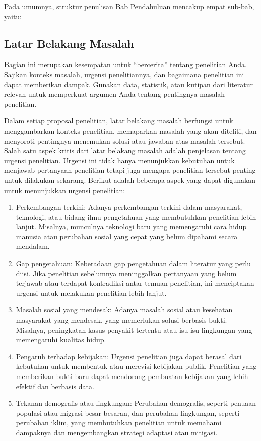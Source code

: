 \documentclass[
  indonesian,
  letterpaper,
]{scrbook}
\providecommand{\tightlist}{%
  \setlength{\itemsep}{0pt}\setlength{\parskip}{0pt}}
\begin{document}
Pada umumnya, struktur penulisan Bab Pendahuluan mencakup empat sub-bab,
yaitu:

\subsection*{Latar Belakang Masalah}\label{latar-belakang-masalah}

Bagian ini merupakan kesempatan untuk ``bercerita'' tentang penelitian
Anda. Sajikan konteks masalah, urgensi penelitiannya, dan bagaimana
penelitian ini dapat memberikan dampak. Gunakan data, statistik, atau
kutipan dari literatur relevan untuk memperkuat argumen Anda tentang
pentingnya masalah penelitian.

Dalam setiap proposal penelitian, latar belakang masalah berfungsi untuk
menggambarkan konteks penelitian, memaparkan masalah yang akan diteliti,
dan menyoroti pentingnya menemukan solusi atau jawaban atas masalah
tersebut. Salah satu aspek kritis dari latar belakang masalah adalah
penjelasan tentang urgensi penelitian. Urgensi ini tidak hanya
menunjukkan kebutuhan untuk menjawab pertanyaan penelitian tetapi juga
mengapa penelitian tersebut penting untuk dilakukan sekarang. Berikut
adalah beberapa aspek yang dapat digunakan untuk menunjukkan urgensi
penelitian:

\begin{enumerate}
\def\labelenumi{\arabic{enumi}.}
\tightlist
\item
  Perkembangan terkini: Adanya perkembangan terkini dalam masyarakat,
  teknologi, atau bidang ilmu pengetahuan yang membutuhkan penelitian
  lebih lanjut. Misalnya, munculnya teknologi baru yang memengaruhi cara
  hidup manusia atau perubahan sosial yang cepat yang belum dipahami
  secara mendalam.
\item
  Gap pengetahuan: Keberadaan gap pengetahuan dalam literatur yang perlu
  diisi. Jika penelitian sebelumnya meninggalkan pertanyaan yang belum
  terjawab atau terdapat kontradiksi antar temuan penelitian, ini
  menciptakan urgensi untuk melakukan penelitian lebih lanjut.
\item
  Masalah sosial yang mendesak: Adanya masalah sosial atau kesehatan
  masyarakat yang mendesak, yang memerlukan solusi berbasis bukti.
  Misalnya, peningkatan kasus penyakit tertentu atau isu-isu lingkungan
  yang memengaruhi kualitas hidup.
\item
  Pengaruh terhadap kebijakan: Urgensi penelitian juga dapat berasal
  dari kebutuhan untuk membentuk atau merevisi kebijakan publik.
  Penelitian yang memberikan bukti baru dapat mendorong pembuatan
  kebijakan yang lebih efektif dan berbasis data.
\item
  Tekanan demografis atau lingkungan: Perubahan demografis, seperti
  penuaan populasi atau migrasi besar-besaran, dan perubahan lingkungan,
  seperti perubahan iklim, yang membutuhkan penelitian untuk memahami
  dampaknya dan mengembangkan strategi adaptasi atau mitigasi.
\end{enumerate}
\end{document}
